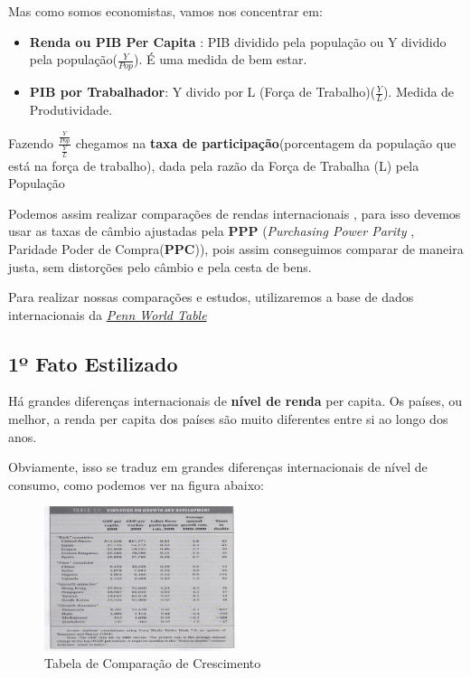 \documentclass[a4paper,12pt]{article}[abntex2]
\begin{document}
Mas como somos economistas, vamos nos concentrar em:
\begin{itemize}
    \item \textbf{Renda ou PIB Per Capita} : PIB dividido pela população ou Y dividido pela população($\frac{Y}{Pop}$). É uma medida de bem estar.
    \item \textbf{PIB por Trabalhador}: Y divido por L (Força de Trabalho)($\frac{Y}{L}$). Medida de Produtividade.
\end{itemize}

Fazendo $\frac{\frac{Y}{Pop}}{\frac{Y}{L}}$ chegamos na \textbf{taxa de participação}(porcentagem da população que está na força de trabalho), dada pela razão da Força de Trabalha (L) pela População

Podemos assim realizar comparações de rendas internacionais , para isso devemos usar as taxas de câmbio ajustadas pela \textbf{PPP} (\textit{Purchasing Power Parity }, Paridade Poder de Compra(\textbf{PPC})), pois assim conseguimos comparar de maneira justa, sem distorções pelo câmbio e pela cesta de bens.

Para realizar nossas comparações e estudos, utilizaremos a base de dados internacionais da \href{https://www.rug.nl/ggdc/productivity/pwt/}{\textit{Penn World Table}}

\subsection{\textbf{1º Fato Estilizado}}

Há grandes diferenças internacionais de \textbf{nível de renda} per capita. Os países, ou melhor, a renda per capita dos países são muito diferentes entre si ao longo dos anos.

Obviamente, isso se traduz em grandes diferenças internacionais de nível de consumo, como podemos ver na figura abaixo:

\begin{figure}[H]
        \centering
        \caption{Tabela de Comparação de Crescimento} 
        \includegraphics[width=0.5\textwidth]{Imagens/a1i2.png}
\end{figure}
\end{document}
